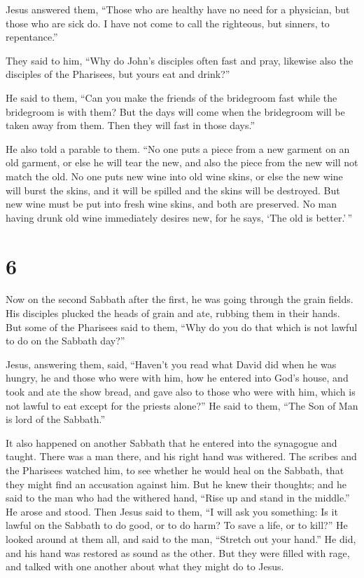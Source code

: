  Jesus answered them, ``Those who are healthy have no need
for a physician, but those who are sick do.  I have not
come to call the righteous, but sinners, to repentance.''

 They said to him, ``Why do John's disciples often fast and
pray, likewise also the disciples of the Pharisees, but yours eat and
drink?''

 He said to them, ``Can you make the friends of the
bridegroom fast while the bridegroom is with them?  But the
days will come when the bridegroom will be taken away from them. Then
they will fast in those days.''

 He also told a parable to them. ``No one puts a piece from
a new garment on an old garment, or else he will tear the new, and also
the piece from the new will not match the old.  No one puts
new wine into old wine skins, or else the new wine will burst the skins,
and it will be spilled and the skins will be destroyed. 
But new wine must be put into fresh wine skins, and both are preserved.
 No man having drunk old wine immediately desires new, for
he says, `The old is better.'\,''

\hypertarget{section-5}{%
\section{6}\label{section-5}}

 Now on the second Sabbath after the first, he was going
through the grain fields. His disciples plucked the heads of grain and
ate, rubbing them in their hands.  But some of the Pharisees
said to them, ``Why do you do that which is not lawful to do on the
Sabbath day?''

 Jesus, answering them, said, ``Haven't you read what David
did when he was hungry, he and those who were with him,  how
he entered into God's house, and took and ate the show bread, and gave
also to those who were with him, which is not lawful to eat except for
the priests alone?''  He said to them, ``The Son of Man is
lord of the Sabbath.''

 It also happened on another Sabbath that he entered into
the synagogue and taught. There was a man there, and his right hand was
withered.  The scribes and the Pharisees watched him, to see
whether he would heal on the Sabbath, that they might find an accusation
against him.  But he knew their thoughts; and he said to the
man who had the withered hand, ``Rise up and stand in the middle.'' He
arose and stood.  Then Jesus said to them, ``I will ask you
something: Is it lawful on the Sabbath to do good, or to do harm? To
save a life, or to kill?''  He looked around at them all,
and said to the man, ``Stretch out your hand.'' He did, and his hand was
restored as sound as the other.  But they were filled with
rage, and talked with one another about what they might do to Jesus.

